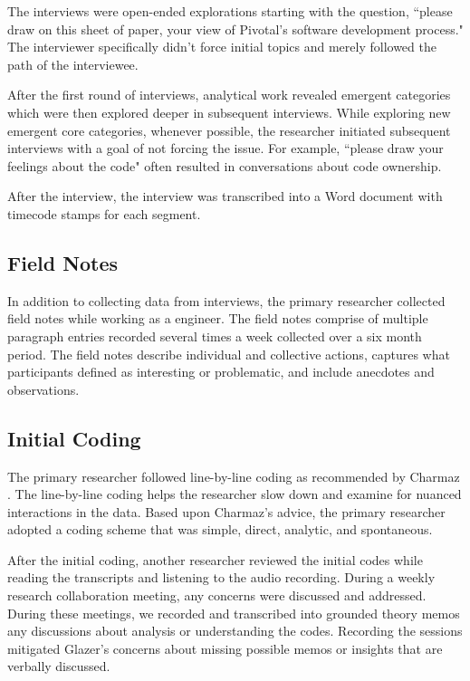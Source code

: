 The interviews were open-ended explorations starting with the question, ``please draw on this sheet of paper, your view of Pivotal's software development process." The interviewer specifically didn't force initial topics and merely followed the path of the interviewee. 

After the first round of interviews, analytical work revealed emergent categories which were then explored deeper in subsequent interviews. While exploring new emergent core categories, whenever possible, the researcher initiated subsequent interviews with a goal of not forcing the issue. For example, ``please draw your feelings about the code" often resulted in conversations about code ownership. 

After the interview, the interview was transcribed into a Word document with timecode stamps for each segment.

\subsection{Field Notes}
In addition to collecting data from interviews, the primary researcher collected field notes while working as a engineer. The field notes comprise of multiple paragraph entries recorded several times a week collected over a six month period. The field notes describe individual and collective actions, captures what participants defined as interesting or problematic, and include anecdotes and observations. 
\subsection{Initial Coding}
The primary researcher followed line-by-line coding as recommended by Charmaz \cite{Charmaz}. The line-by-line coding helps the researcher slow down and examine for nuanced interactions in the data. Based upon Charmaz's advice, the primary researcher adopted a coding scheme that was simple, direct, analytic, and spontaneous.  

After the initial coding, another researcher reviewed the initial codes while reading the transcripts and listening to the audio recording. During a weekly research collaboration meeting, any concerns were discussed and addressed. During these meetings, we recorded and transcribed into grounded theory memos any discussions about analysis or understanding the codes. Recording the sessions mitigated Glazer's concerns about missing possible memos or insights that are verbally discussed. \cite{GlaserTheoreticalSensitivity}

